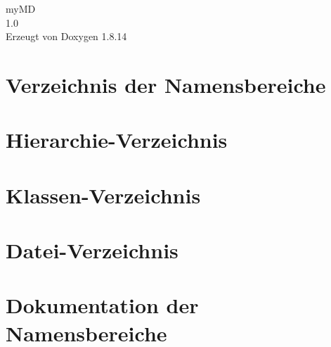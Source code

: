 \documentclass[twoside]{book}
\newcommand{\+}{\discretionary{\mbox{\scriptsize$\hookleftarrow$}}{}{}}
\newcommand{\clearemptydoublepage}{%
  \newpage{\pagestyle{empty}\cleardoublepage}%
}
\begin{document}
\hypersetup{pageanchor=false,
             bookmarksnumbered=true,
             pdfencoding=unicode
            }
\begin{titlepage}
\vspace*{7cm}
\begin{center}%
{\Large my\+MD \\[1ex]\large 1.\+0 }\\
\vspace*{1cm}
{\large Erzeugt von Doxygen 1.8.14}\\
\end{center}
\end{titlepage}
\clearemptydoublepage
{}
\tableofcontents
\clearemptydoublepage
{}
\hypersetup{pageanchor=true}

\chapter{Verzeichnis der Namensbereiche}

\chapter{Hierarchie-\/\+Verzeichnis}

\chapter{Klassen-\/\+Verzeichnis}

\chapter{Datei-\/\+Verzeichnis}

\chapter{Dokumentation der Namensbereiche}

























\end{document}
